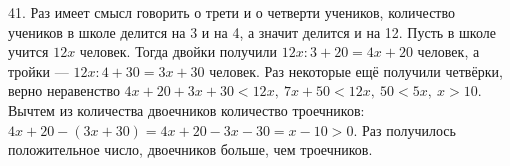 41. Раз имеет смысл говорить о трети и о четверти учеников, количество учеников в школе делится на 3 и на 4, а значит делится и на 12. Пусть в школе учится $12x$ человек. Тогда двойки получили $12x:3+20=4x+20$ человек, а тройки --- $12x:4+30=3x+30$ человек. Раз некоторые ещё получили четвёрки, верно неравенство $4x+20+3x+30<12x,\ 7x+50<12x,\ 50<5x,\ x>10.$ Вычтем из количества двоечников количество троечников: $4x+20-(3x+30)=4x+20-3x-30=x-10>0.$ Раз получилось положительное число, двоечников больше, чем троечников.\\
